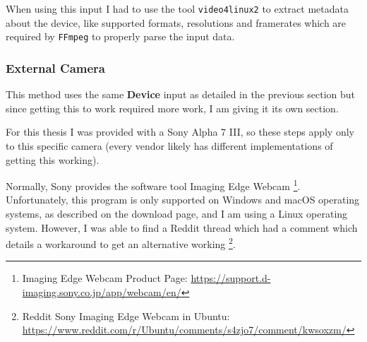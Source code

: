 When using this input I had to use the tool \texttt{video4linux2} to extract metadata about the device, like supported formats, resolutions and framerates which are required by \texttt{FFmpeg} to properly parse the input data.

\subsubsection{External Camera\label{sec:ext_cam}}

This method uses the same \textbf{Device} input as detailed in the previous section but since getting this to work required more work, I am giving it its own section.

For this thesis I was provided with a Sony Alpha 7 III, so these steps apply only to this specific camera (every vendor likely has different implementations of getting this working).

Normally, Sony provides the software tool Imaging Edge Webcam \footnote{Imaging Edge Webcam Product Page: \url{https://support.d-imaging.sony.co.jp/app/webcam/en/}}. Unfortunately, this program is only supported on Windows and macOS operating systems, as described on the download page, and I am using a Linux operating system. However, I was able to find a Reddit thread which had a comment which details a workaround to get an alternative working \footnote{Reddit Sony Imaging Edge Webcam in Ubuntu: \url{https://www.reddit.com/r/Ubuntu/comments/s4zjo7/comment/kwsoxzm/}}.

